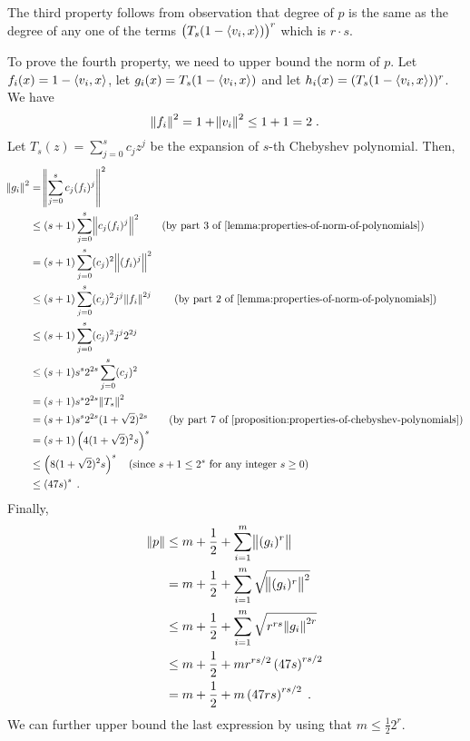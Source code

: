 The third property follows from observation that degree of $p$
is the same as the degree of any one of the terms
$\left( T_s(1 - \left\langle v_i, x \right\rangle) \right)^r$ which is $r \cdot s$.

To prove the fourth property, we need to upper bound the norm of $p$.
Let $f_i(x) = 1 - \left\langle v_i, x \right\rangle$, let $g_i(x) = T_s(1 - \left\langle v_i, x \right\rangle)$
and let $h_i(x) = (T_s(1 - \left\langle v_i, x \right\rangle))^r$. We have
$$
\norm{f_i}^2 = 1 + \norm{v_i}^2 \le 1 + 1 = 2 \; .
$$
Let $T_s(z) = \sum_{j=0}^s c_j z^j$ be the expansion of $s$-th Chebyshev polynomial.
Then,
\begingroup
\allowdisplaybreaks
\begin{align*}
\norm{g_i}^2
& = \norm{ \sum_{j=0}^s c_j (f_i)^j }^2 \\
& \le (s + 1) \sum_{j=0}^s \norm{c_j (f_i)^j}^2 \qquad \text{(by~part 3 of \autoref{lemma:properties-of-norm-of-polynomials})} \\
& = (s + 1) \sum_{j=0}^s (c_j)^2 \norm{(f_i)^j}^2 \\
& \le (s + 1) \sum_{j=0}^s (c_j)^2 j^j \norm{f_i}^{2j} \qquad \text{(by~part 2 of \autoref{lemma:properties-of-norm-of-polynomials})} \\
& \le (s + 1) \sum_{j=0}^s (c_j)^2 j^j 2^{2j} \\
& \le (s + 1) s^s 2^{2s} \sum_{j=0}^s (c_j)^2 \\
& = (s + 1) s^s 2^{2s} \norm{T_s}^2 \\
& = (s + 1) s^s 2^{2s} (1 + \sqrt{2})^{2s} \qquad \text{(by~part 7 of \autoref{proposition:properties-of-chebyshev-polynomials})} \\
& = (s + 1) \left(4(1+\sqrt{2})^2 s \right)^s \\
& \le \left(8(1+\sqrt{2})^2 s \right)^s \quad \text{(since $s+1 \le 2^s$ for any integer $s \ge 0$)} \\
& \le \left(47 s \right)^s \; .
\end{align*}
\endgroup
Finally,
\begin{align*}
\norm{p}
& \le m + \frac{1}{2} + \sum_{i=1}^m \norm{(g_i)^r} \\
& = m + \frac{1}{2} + \sum_{i=1}^m \sqrt{\norm{(g_i)^r}^2} \\
& \le m + \frac{1}{2} + \sum_{i=1}^m \sqrt{r^{rs} \norm{g_i}^{2r}} \\
& \le m + \frac{1}{2} + m r^{rs/2} \left(47 s \right)^{rs/2} \\
& = m + \frac{1}{2} + m \left(47 rs \right)^{rs/2} \; .
\end{align*}
We can further upper bound the last expression by using that $m \le \frac{1}{2} 2^r$.
